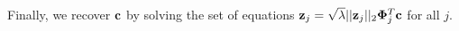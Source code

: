Finally, we recover $\mathbf{c}$ by solving the set of equations $\mathbf{z}_j = \sqrt{\lambda}||\mathbf{z}_j||_2 \mathbf{\Phi}_j^T \mathbf{c}$ for all $j$.
%
%
%
%
%
